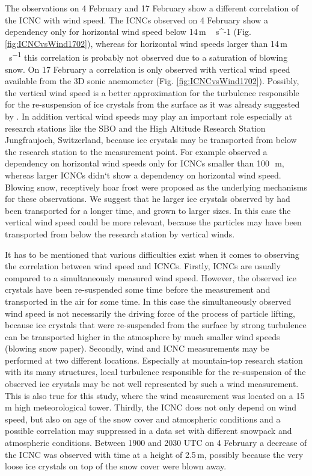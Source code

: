 \documentclass[draft,linenumbers]{agujournal}
\begin{document}
The observations on 4 February and 17 February show a different correlation of the ICNC with wind speed. The ICNCs observed on 4 February show a dependency only for horizontal wind speed below 14\,\si{m\,{s^{-1}}} (Fig. \ref{fig:ICNCvsWind1702}), whereas for horizontal wind speeds larger than 14\,\si{m\,s^{-1}} this correlation is probably not observed due to a saturation of blowing snow. On 17 February a correlation is only observed with vertical wind speed available from the 3D sonic anemometer (Fig. \ref{fig:ICNCvsWind1702}). Possibly, the vertical wind speed is a better approximation for the turbulence responsible for the re-suspension of ice crystals from the surface as it was already suggested by \citet{Ham14}. In addition vertical wind speeds may play an important role especially at research stations like the SBO and the High Altitude Research Station Jungfraujoch, Switzerland, because ice crystals may be transported from below the research station to the measurement point. For example \citep{Loy15} observed a dependency on horizontal wind speeds only for ICNCs smaller than 100\,\si{\mu m}, whereas larger ICNCs didn`t show a dependency on horizontal wind speed. Blowing snow, receptively hoar frost were proposed as the underlying mechanisms for these observations. We suggest that he larger ice crystals observed by \citet{Loy15} had been transported for a longer time, and grown to larger sizes. In this case the vertical wind speed could be more relevant, because the particles may have been transported from below the research station by vertical winds.

It has to be mentioned that various difficulties exist when it comes to observing the correlation between wind speed and ICNCs. Firstly, ICNCs are usually compared to a simultaneously measured wind speed. However, the observed ice crystals have been re-suspended some time before the measurement and transported in the air for some time. In this case the simultaneously observed wind speed is not necessarily the driving force of the process of particle lifting, because ice crystals that were re-suspended from the surface by strong turbulence can be transported higher in the atmosphere by much smaller wind speeds (blowing snow paper). Secondly, wind and ICNC measurements may be performed at two different locations. Especially at mountain-top research station with its many structures, local turbulence responsible for the re-suspension of the observed ice crystals may be not well represented by such a wind measurement. This is also true for this study, where the wind measurement was located on a 15\,\si{m} high meteorological tower. Thirdly, the ICNC does not only depend on wind speed, but also on age of the snow cover and atmospheric conditions and a possible correlation may suppressed in a data set with different snowpack and atmospheric conditions. Between 1900 and 2030 UTC on 4 February a decrease of the ICNC was observed with time at a height of 2.5\,\si{m}, possibly because the very loose ice crystals on top of the snow cover were blown away.
\end{document}
